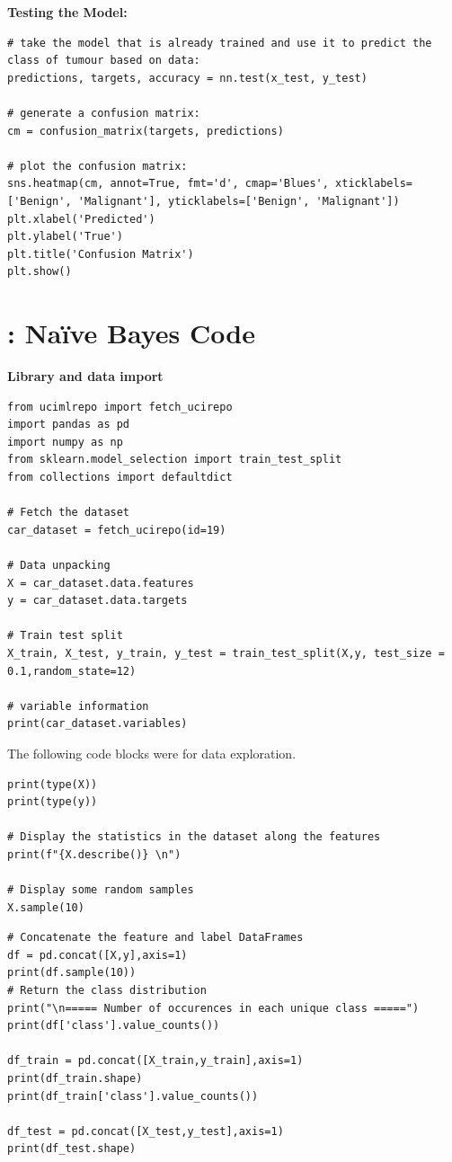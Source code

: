 \documentclass[a4paper]{article}
\begin{document}
\newpage
\textbf{Testing the Model:}
\begin{lstlisting}[basicstyle= \scriptsize]
# take the model that is already trained and use it to predict the class of tumour based on data:
predictions, targets, accuracy = nn.test(x_test, y_test)

# generate a confusion matrix:
cm = confusion_matrix(targets, predictions)

# plot the confusion matrix:
sns.heatmap(cm, annot=True, fmt='d', cmap='Blues', xticklabels=['Benign', 'Malignant'], yticklabels=['Benign', 'Malignant'])
plt.xlabel('Predicted')
plt.ylabel('True')
plt.title('Confusion Matrix')
plt.show()
\end{lstlisting}

\newpage
\section{\hspace{-5mm}: Naïve Bayes Code}
\label{section:naivebayes_code}
\textbf{Library and data import}
\begin{lstlisting}
from ucimlrepo import fetch_ucirepo
import pandas as pd
import numpy as np
from sklearn.model_selection import train_test_split
from collections import defaultdict

# Fetch the dataset
car_dataset = fetch_ucirepo(id=19)

# Data unpacking
X = car_dataset.data.features
y = car_dataset.data.targets

# Train test split
X_train, X_test, y_train, y_test = train_test_split(X,y, test_size = 0.1,random_state=12)

# variable information 
print(car_dataset.variables)
\end{lstlisting}

The following code blocks were for data exploration.

\begin{lstlisting}
print(type(X))
print(type(y))

# Display the statistics in the dataset along the features
print(f"{X.describe()} \n")

# Display some random samples
X.sample(10)
\end{lstlisting}

\begin{lstlisting}
# Concatenate the feature and label DataFrames
df = pd.concat([X,y],axis=1)
print(df.sample(10))
# Return the class distribution
print("\n===== Number of occurences in each unique class =====")
print(df['class'].value_counts())

df_train = pd.concat([X_train,y_train],axis=1)
print(df_train.shape)
print(df_train['class'].value_counts())

df_test = pd.concat([X_test,y_test],axis=1)
print(df_test.shape)
\end{lstlisting}
\end{document}
